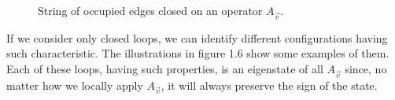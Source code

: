\documentclass{Configuration_Files/PoliMi3i_thesis}
\begin{document}
\begin{figure}
\begin{center}
\end{center}

\caption{String of occupied edges closed on an operator $A_{\vec{v}} $.}
\label{fig:Aveigen}
\end{figure}
		


If we consider only closed loops, we can identify different configurations having such characteristic. The illustrations in figure 1.6 show some examples of them.
Each of these loops, having such properties, is an eigenstate of all $A_{\vec{v}} $ since, no matter how we locally apply $A_{\vec{v}} $, it will always preserve the sign of the state. 

\end{document}
